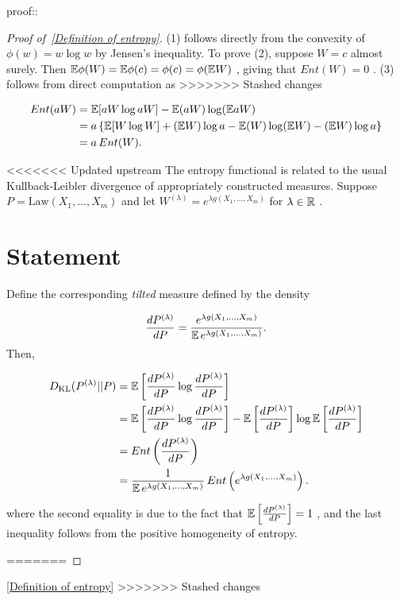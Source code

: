 \documentclass{article}
\begin{document}
proof::
\begin{proof}[Proof of~{\autoref{Definition of entropy}}]
\label{proof:Definition of entropy}
(1) follows directly from the convexity of  $\phi(w) = w \log w$  by Jensen's inequality. To prove (2), suppose  $W = c$  almost surely. Then  $\mathbb{E}\phi(W) = \mathbb{E} \phi(c) = \phi(c) = \phi(\mathbb{E} W)$ , giving that  $Ent(W)=0$ . (3) follows from direct computation as
>>>>>>> Stashed changes


\begin{align*}
Ent(aW) &= \mathbb{E}[aW \log aW] - \mathbb{E}(aW)\log (\mathbb{E} aW)\\
&= a\left\{ \mathbb{E}[W\log W] + (\mathbb{E} W)\log a - \mathbb{E}(W)\log (\mathbb{E} W) - (\mathbb{E} W)\log a \right\} \\
&= a\,Ent(W).
\end{align*}

<<<<<<< Updated upstream
 The entropy functional is related to the usual Kullback-Leibler divergence of appropriately constructed measures. Suppose  $P = \mathrm{Law}(X_1, \dots, X_m)$  and let  $W^{(\lambda)} = e^{\lambda g(X_1, \dots, X_m)}$  for  $\lambda \in \mathbb{R}$ . 
\section{Statement}
\label{section:Statement}
Define the corresponding  \textit{tilted}  measure defined by the density

\begin{equation*}
\frac{dP^{(\lambda)}}{dP} = \frac{e^{\lambda g(X_1, \dots, X_m)}}{\mathbb{E}\,e^{\lambda g(X_1, \dots, X_m)}}.
\end{equation*}
 Then,


\begin{align*}
D_{\mathrm{KL}}(P^{(\lambda)}||P) &= \mathbb{E}\left[\frac{dP^{(\lambda)}}{dP} \log \frac{dP^{(\lambda)}}{dP}\right] \\
&= \mathbb{E}\left[\frac{dP^{(\lambda)}}{dP} \log \frac{dP^{(\lambda)}}{dP}\right] - \mathbb{E}\left[\frac{dP^{(\lambda)}}{dP}\right]\log \mathbb{E} \left[\frac{dP^{(\lambda)}}{dP}\right]\\
&= Ent\left(\frac{dP^{(\lambda)}}{dP}\right)\\
&= \frac{1}{\mathbb{E}\,e^{\lambda g(X_1, \dots, X_m)}}\, Ent\left(e^{\lambda g(X_1, \dots, X_m)}\right).
\end{align*}

where the second equality is due to the fact that  $\mathbb{E}  \left[ \frac{dP^{(\lambda)}}{dP} \right] = 1$ , and the last inequality follows from the positive homogeneity of entropy.


=======

\end{proof}

\autoref{Definition of entropy}
>>>>>>> Stashed changes

\printbibliography
\end{document}
